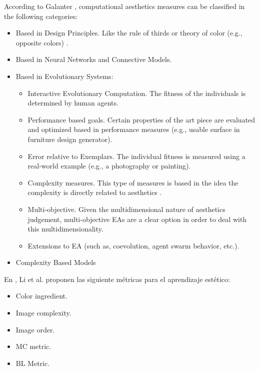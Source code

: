 \documentclass{llncs}
\begin{document}
According to Galanter \cite{galanter2012computational}, computational aesthetics measures can be classified in the following categories:
\begin{itemize}
	\item Based in Design Principles. Like the rule of thirds or theory of color (e.g., opposite colors) \cite{den2012evolving}.
	\item Based in Neural Networks and Connective Models. 
	\item Based in Evolutionary Systems:
		\begin{itemize}
			\item Interactive Evolutionary Computation. The fitness of the individuals is determined by human agents.
			\item Performance based goals. Certain properties of the art piece are evaluated and optimized based in performance measures (e.g., usable surface in furniture design generator).
			\item Error relative to Exemplars. The individual fitness is measured using a real-world example (e.g., a photography or painting). \cite{dipaola2009incorporating}
			\item Complexity measures. This type of measures is based in the idea the complexity is directly related to aesthetics \cite{li2012investigating}.
			\item Multi-objective. Given the multidimensional nature of aesthetics judgement, multi-objective EAs are a clear option in order to deal with this multidimensionality.
			\item Extensions to EA (such as, coevolution, agent swarm behavior, etc.).
		\end{itemize}
	\item Complexity Based Models
\end{itemize}

En \cite{li2012investigating}, Li et al. proponen las siguiente métricas para el aprendizaje estético:
\begin{itemize}
	\item Color ingredient.
	\item Image complexity.
	\item Image order.
	\item MC metric.
	\item BL Metric.
\end{itemize}
\end{document}
